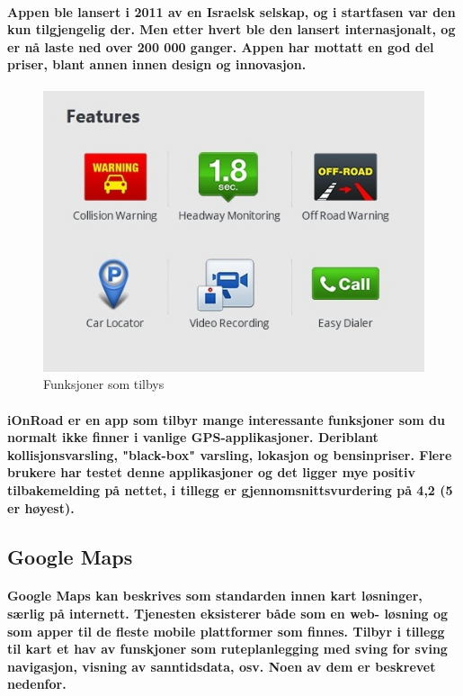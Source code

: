 \paragraph{Appen ble lansert i 2011 av en Israelsk selskap, og i startfasen var den kun tilgjengelig der. Men etter hvert ble den lansert internasjonalt, og er nå laste ned over 200 000 ganger. Appen har mottatt en god del priser, blant annen innen design og innovasjon.}

\begin{figure}[p]
\centering
\includegraphics[scale=0.10]{img/iOnRoad2.jpg}
\caption{Funksjoner som tilbys}
\label{fig:iOnRoad2}
\end{figure}

\paragraph{iOnRoad er en app som tilbyr mange interessante funksjoner som du normalt ikke finner i vanlige GPS-applikasjoner. Deriblant kollisjonsvarsling, "black-box" varsling, lokasjon og bensinpriser. Flere brukere har testet denne applikasjoner og det ligger mye positiv tilbakemelding på nettet, i tillegg er gjennomsnittsvurdering på 4,2 (5 er høyest).}


\subsection{Google Maps}

\paragraph{Google Maps kan beskrives som standarden innen kart løsninger, særlig på internett. Tjenesten eksisterer både som en web- løsning og som apper til de fleste mobile plattformer som finnes. Tilbyr i tillegg til kart et hav av funskjoner som ruteplanlegging med sving for sving navigasjon, visning av sanntidsdata, osv. Noen av dem er beskrevet nedenfor.}

